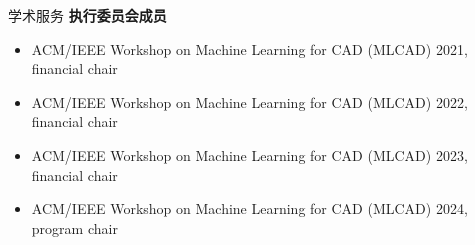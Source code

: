 \begin{rSection}{学术服务}
\textbf{执行委员会成员}
\begin{itemize}
    \item ACM/IEEE Workshop on Machine Learning for CAD (MLCAD) 2021, financial chair
    \item ACM/IEEE Workshop on Machine Learning for CAD (MLCAD) 2022, financial chair
    \item ACM/IEEE Workshop on Machine Learning for CAD (MLCAD) 2023, financial chair
    \item ACM/IEEE Workshop on Machine Learning for CAD (MLCAD) 2024, program chair
\end{itemize}

\end{rSection}


